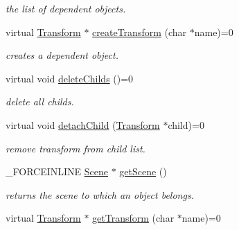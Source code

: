 \begin{DoxyCompactItemize}
\begin{DoxyCompactList}\small\item\em the list of dependent objects. \end{DoxyCompactList}\item 
\hypertarget{classcsad_1_1_transform_a6451c94d7824dc6698025e3d133eb2e0}{virtual \hyperlink{classcsad_1_1_transform}{Transform} $\ast$ \hyperlink{classcsad_1_1_transform_a6451c94d7824dc6698025e3d133eb2e0}{create\-Transform} (char $\ast$name)=0}\label{classcsad_1_1_transform_a6451c94d7824dc6698025e3d133eb2e0}

\begin{DoxyCompactList}\small\item\em creates a dependent object. \end{DoxyCompactList}\item 
\hypertarget{classcsad_1_1_transform_a01d84357317f0b6e21bcc46e49945766}{virtual void \hyperlink{classcsad_1_1_transform_a01d84357317f0b6e21bcc46e49945766}{delete\-Childs} ()=0}\label{classcsad_1_1_transform_a01d84357317f0b6e21bcc46e49945766}

\begin{DoxyCompactList}\small\item\em delete all childs. \end{DoxyCompactList}\item 
\hypertarget{classcsad_1_1_transform_a2b87024c697a4c9ac79a30359799fd45}{virtual void \hyperlink{classcsad_1_1_transform_a2b87024c697a4c9ac79a30359799fd45}{detach\-Child} (\hyperlink{classcsad_1_1_transform}{Transform} $\ast$child)=0}\label{classcsad_1_1_transform_a2b87024c697a4c9ac79a30359799fd45}

\begin{DoxyCompactList}\small\item\em remove transform from child list. \end{DoxyCompactList}\item 
\hypertarget{classcsad_1_1_transform_a9e830ddc111afbc7c99b30a228601e6c}{\-\_\-\-F\-O\-R\-C\-E\-I\-N\-L\-I\-N\-E \hyperlink{classcsad_1_1_scene}{Scene} $\ast$ \hyperlink{classcsad_1_1_transform_a9e830ddc111afbc7c99b30a228601e6c}{get\-Scene} ()}\label{classcsad_1_1_transform_a9e830ddc111afbc7c99b30a228601e6c}

\begin{DoxyCompactList}\small\item\em returns the scene to which an object belongs. \end{DoxyCompactList}\item 
\hypertarget{classcsad_1_1_transform_a2b0acd6ec11c72f62332ec9b23be784d}{virtual \hyperlink{classcsad_1_1_transform}{Transform} $\ast$ \hyperlink{classcsad_1_1_transform_a2b0acd6ec11c72f62332ec9b23be784d}{get\-Transform} (char $\ast$name)=0}\label{classcsad_1_1_transform_a2b0acd6ec11c72f62332ec9b23be784d}


\end{DoxyCompactItemize}
